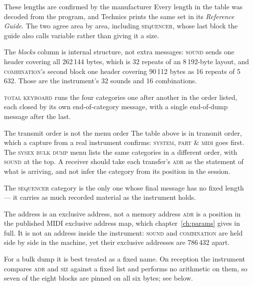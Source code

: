 \begin{note}{These lengths are confirmed by the manufacturer}
Every length in the table was decoded from the program, and Technics prints the same set
in its \emph{Reference Guide}. The two agree area by area, including \textsc{sequencer},
whose last block the guide also calls variable rather than giving it a size.
\end{note}

The \emph{blocks} column is internal structure, not extra messages: \textsc{sound} sends
one header covering all 262\,144 bytes, which is 32 repeats of an 8\,192-byte layout, and
\textsc{combination}'s second block one header covering 90\,112 bytes as 16 repeats of
5\,632. Those are the instrument's 32 sounds and 16 combinations.

\textsc{total keyboard} runs the four categories one after another in the order listed,
each closed by its own end-of-category message, with a single end-of-dump message after
the last.

\begin{note}{The transmit order is not the menu order}
The table above is in transmit order, which a capture from a real instrument confirms:
\textsc{system, part \& midi} goes first. The \textsc{sysex bulk dump} menu lists the
same categories in a different order, with \textsc{sound} at the top. A receiver should
take each transfer's \textsc{adr} as the statement of what is arriving, and not infer the
category from its position in the session.
\end{note}

The \textsc{sequencer} category is the only one whose final message has no fixed length ---
it carries as much recorded material as the instrument holds.

\begin{note}{The address is an exclusive address, not a memory address}
\textsc{adr} is a position in the published MIDI exclusive address map, which
chapter~\ref{ch:params} gives in full. It is not an address inside the instrument:
\textsc{sound} and \textsc{combination} are held side by side in the machine, yet their
exclusive addresses are 786\,432 apart.

For a bulk dump it is best treated as a fixed name. On reception the instrument compares
\textsc{adr} and \textsc{siz} against a fixed list and performs no arithmetic on them, so
seven of the eight blocks are pinned on all six bytes; see below.
\end{note}

